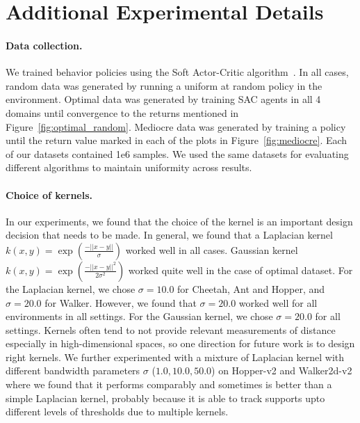 


\section{Additional Experimental Details}
\label{app:additional_details}

\paragraph{Data collection.} We trained behavior policies using the Soft Actor-Critic algorithm~\cite{haarnoja2018sac}. In all cases, random data was generated by running a uniform at random policy in the environment. Optimal data was generated by training SAC agents in all 4 domains until convergence to the returns mentioned in Figure~\ref{fig:optimal_random}. Mediocre data was generated by training a policy until the return value marked in each of the plots in Figure~\ref{fig:mediocre}. Each of our datasets contained 1e6 samples. We used the same datasets for evaluating different algorithms to maintain uniformity across results.

\paragraph{Choice of kernels.} In our experiments, we found that the choice of the kernel is an important design decision that needs to be made. In general, we found that a Laplacian kernel $k(x, y) = \exp(\frac{-||x - y||}{\sigma})$ worked well in all cases. Gaussian kernel $k(x, y) =\exp(\frac{-||x - y||^2}{2 \sigma^2})$ worked quite well in the case of optimal dataset. For the Laplacian kernel, we chose $\sigma = 10.0$ for Cheetah, Ant and Hopper, and $\sigma=20.0$ for Walker. However, we found that $\sigma=20.0$ worked well for all environments in all settings. For the Gaussian kernel, we chose $\sigma=20.0$ for all settings. Kernels often tend to not provide relevant measurements of distance especially in high-dimensional spaces, so one direction for future work is to design right kernels. We further experimented with a mixture of Laplacian kernel with different bandwidth parameters $\sigma$ ($1.0, 10.0, 50.0$) on Hopper-v2 and Walker2d-v2 where we found that it performs comparably and sometimes is better than a simple Laplacian kernel, probably because it is able to track supports upto different levels of thresholds due to multiple kernels.   

